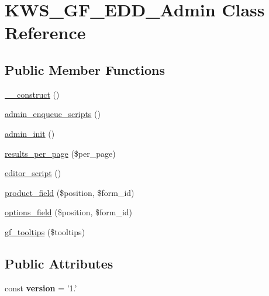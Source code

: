 \hypertarget{class_k_w_s___g_f___e_d_d___admin}{\section{K\-W\-S\-\_\-\-G\-F\-\_\-\-E\-D\-D\-\_\-\-Admin Class Reference}
\label{class_k_w_s___g_f___e_d_d___admin}
}
\subsection*{Public Member Functions}
\begin{DoxyCompactItemize}
\item 
\hyperlink{class_k_w_s___g_f___e_d_d___admin_ae392ca0c2d63efcf945569b1edab979f}{\-\_\-\-\_\-construct} ()
\item 
\hyperlink{class_k_w_s___g_f___e_d_d___admin_ad7785bfc45d2ad8ea35b26bebfac0ab1}{admin\-\_\-enqueue\-\_\-scripts} ()
\item 
\hyperlink{class_k_w_s___g_f___e_d_d___admin_a60c31b14bebb3e2081071dcb35582c38}{admin\-\_\-init} ()
\item 
\hyperlink{class_k_w_s___g_f___e_d_d___admin_a35ffdc2b2cc11f0c90e8a490017a936a}{results\-\_\-per\-\_\-page} (\$per\-\_\-page)
\item 
\hyperlink{class_k_w_s___g_f___e_d_d___admin_a80286d8be999bc70a143660a24211b83}{editor\-\_\-script} ()
\item 
\hyperlink{class_k_w_s___g_f___e_d_d___admin_a9cac50b19e5d05a90a8d8335c6d34dba}{product\-\_\-field} (\$position, \$form\-\_\-id)
\item 
\hyperlink{class_k_w_s___g_f___e_d_d___admin_ac23cfd9b6daa82f965a510330690e813}{options\-\_\-field} (\$position, \$form\-\_\-id)
\item 
\hyperlink{class_k_w_s___g_f___e_d_d___admin_a1215a4d42500db88628f6a58b91fe254}{gf\-\_\-tooltips} (\$tooltips)
\end{DoxyCompactItemize}
\subsection*{Public Attributes}
\begin{DoxyCompactItemize}
\item 
\hypertarget{class_k_w_s___g_f___e_d_d___admin_a9f36cbe5bac7c437db95134c419c44e8}{const {\bfseries version} = '1.'}\label{class_k_w_s___g_f___e_d_d___admin_a9f36cbe5bac7c437db95134c419c44e8}

\end{DoxyCompactItemize}


